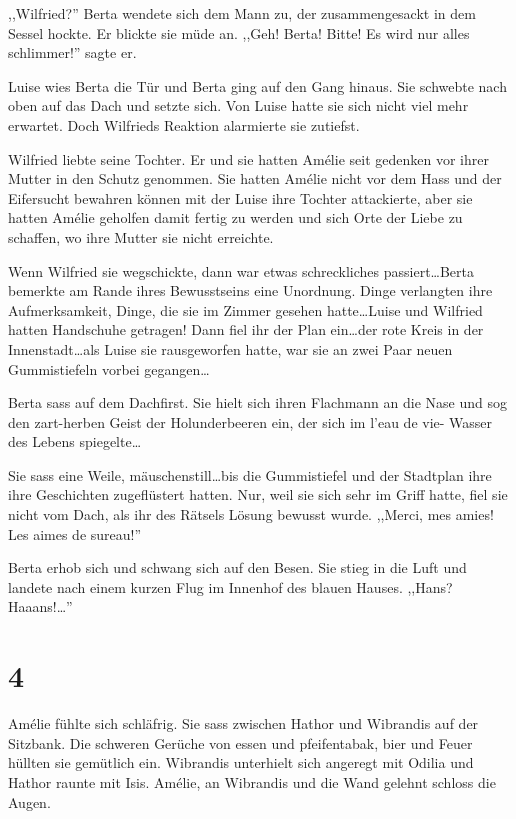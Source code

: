 ,,Wilfried?'' Berta wendete sich dem Mann zu, der zusammengesackt in dem Sessel hockte. Er blickte sie müde an. ,,Geh! Berta! Bitte! Es wird nur alles schlimmer!'' sagte er.

Luise wies Berta die Tür und Berta ging auf den Gang hinaus. Sie schwebte nach oben auf das Dach und setzte sich. Von Luise hatte sie sich nicht viel mehr erwartet. Doch Wilfrieds Reaktion alarmierte sie zutiefst.

Wilfried liebte seine Tochter. Er und sie hatten Amélie seit gedenken vor ihrer Mutter in den Schutz genommen. Sie hatten Amélie nicht vor dem Hass und der Eifersucht bewahren können mit der Luise ihre Tochter attackierte, aber sie hatten Amélie geholfen damit fertig zu werden und sich Orte der Liebe zu schaffen, wo ihre Mutter sie nicht erreichte.

Wenn Wilfried sie wegschickte, dann war etwas schreckliches passiert\dots Berta bemerkte am Rande ihres Bewusstseins eine Unordnung. Dinge verlangten ihre Aufmerksamkeit, Dinge, die sie im Zimmer gesehen hatte\dots Luise und Wilfried hatten Handschuhe getragen! Dann fiel ihr der Plan ein\dots der rote Kreis in der Innenstadt\dots als Luise sie rausgeworfen hatte, war sie an zwei Paar neuen Gummistiefeln vorbei gegangen\dots

Berta sass auf dem Dachfirst. Sie hielt sich ihren Flachmann an die Nase und sog den zart-herben Geist der Holunderbeeren ein, der sich im l'eau de vie- Wasser des Lebens spiegelte\dots

Sie sass eine Weile, mäuschenstill\dots bis die Gummistiefel und der Stadtplan ihre ihre Geschichten zugeflüstert hatten. Nur, weil sie sich sehr im Griff hatte, fiel sie nicht vom Dach, als ihr des Rätsels Lösung bewusst wurde. ,,Merci, mes amies! Les aimes de sureau!''

Berta erhob sich und schwang sich auf den Besen. Sie stieg in die Luft und landete nach einem kurzen Flug im Innenhof des blauen Hauses. ,,Hans? Haaans!\dots ''

\section*{4}

Amélie fühlte sich schläfrig. Sie sass zwischen Hathor und Wibrandis auf der Sitzbank. Die schweren Gerüche von essen und pfeifentabak, bier und Feuer hüllten sie gemütlich ein. Wibrandis unterhielt sich angeregt mit Odilia und Hathor raunte mit Isis. Amélie, an Wibrandis und die Wand gelehnt schloss die Augen.

